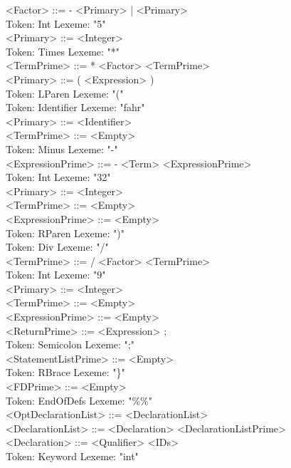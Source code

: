 \documentclass[11pt]{article}
\begin{document}
        <Factor> ::= - <Primary> | <Primary> \\
Token: Int       Lexeme: "5" \\
        <Primary> ::= <Integer> \\
Token: Times     Lexeme: "*" \\
        <TermPrime> ::= * <Factor> <TermPrime> \\
        <Primary> ::= ( <Expression> ) \\
Token: LParen    Lexeme: "(" \\
Token: Identifier        Lexeme: "fahr" \\
        <Primary> ::= <Identifier> \\
        <TermPrime> ::= <Empty> \\
Token: Minus     Lexeme: "-" \\
        <ExpressionPrime> ::= - <Term> <ExpressionPrime> \\
Token: Int       Lexeme: "32" \\
        <Primary> ::= <Integer> \\
        <TermPrime> ::= <Empty> \\
        <ExpressionPrime> ::= <Empty> \\
Token: RParen    Lexeme: ")" \\
Token: Div       Lexeme: "/" \\
        <TermPrime> ::= / <Factor> <TermPrime> \\
Token: Int       Lexeme: "9" \\
        <Primary> ::= <Integer> \\
        <TermPrime> ::= <Empty> \\
        <ExpressionPrime> ::= <Empty> \\
        <ReturnPrime> ::= <Expression> ; \\
Token: Semicolon         Lexeme: ";" \\
        <StatementListPrime> ::= <Empty> \\
Token: RBrace    Lexeme: "\}" \\
        <FDPrime> ::= <Empty> \\
Token: EndOfDefs         Lexeme: "\%\%" \\
        <OptDeclarationList> ::= <DeclarationList> \\
        <DeclarationList> ::= <Declaration> <DeclarationListPrime> \\
        <Declaration> ::= <Qualifier> <IDs> \\
Token: Keyword   Lexeme: "int" \\
\end{document}
